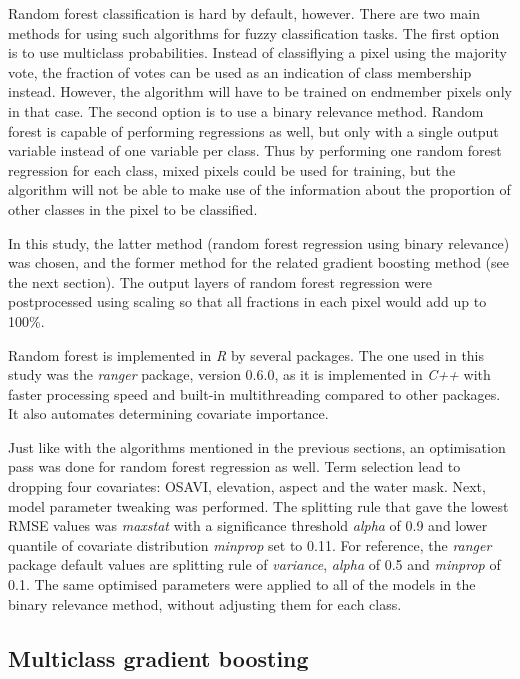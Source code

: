 \documentclass[a4paper,12pt]{scrbook}
\begin{document}
Random forest classification is hard by default, however. There are two main methods for using such algorithms for fuzzy classification tasks. The first option is to use multiclass probabilities. Instead of classiflying a pixel using the majority vote, the fraction of votes can be used as an indication of class membership instead. However, the algorithm will have to be trained on endmember pixels only in that case. The second option is to use a binary relevance method. Random forest is capable of performing regressions as well, but only with a single output variable instead of one variable per class. Thus by performing one random forest regression for each class, mixed pixels could be used for training, but the algorithm will not be able to make use of the information about the proportion of other classes in the pixel to be classified.

In this study, the latter method (random forest regression using binary relevance) was chosen, and the former method for the related gradient boosting method (see the next section). The output layers of random forest regression were postprocessed using scaling so that all fractions in each pixel would add up to 100\%.

Random forest is implemented in \textit{R} by several packages. The one used in this study was the \textit{ranger} package, version 0.6.0, as it is implemented in \textit{C++} with faster processing speed and built-in multithreading compared to other packages. It also automates determining covariate importance.

Just like with the algorithms mentioned in the previous sections, an optimisation pass was done for random forest regression as well. Term selection lead to dropping four covariates: OSAVI, elevation, aspect and the water mask. Next, model parameter tweaking was performed. The splitting rule that gave the lowest RMSE values was \textit{maxstat} with a significance threshold \textit{alpha} of 0.9 and lower quantile of covariate distribution \textit{minprop} set to 0.11. For reference, the \textit{ranger} package default values are splitting rule of \textit{variance}, \textit{alpha} of 0.5 and \textit{minprop} of 0.1. The same optimised parameters were applied to all of the models in the binary relevance method, without adjusting them for each class.

\subsection{Multiclass gradient boosting}
\end{document}
